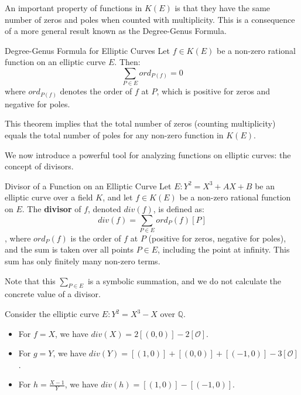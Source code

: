 \documentclass{article}
\begin{document}
An important property of functions in $K(E)$ is that they have the same number of zeros and poles when counted with multiplicity. This is a consequence of a more general result known as the Degree-Genus Formula.

\begin{theorem}{Degree-Genus Formula for Elliptic Curves}{}
Let $f \in K(E)$ be a non-zero rational function on an elliptic curve $E$. Then:
\begin{equation}
    \sum_{P \in E} ord_{P(f)} = 0
\end{equation}
where $ord_{P(f)}$ denotes the order of $f$ at $P$, which is positive for zeros and negative for poles.
\end{theorem}

This theorem implies that the total number of zeros (counting multiplicity) equals the total number of poles for any non-zero function in $K(E)$.

We now introduce a powerful tool for analyzing functions on elliptic curves: the concept of divisors.

\begin{definition}{Divisor of a Function on an Elliptic Curve}{}
Let $E: Y^2 = X^3 + AX + B$ be an elliptic curve over a field $K$, and let $f \in K(E)$ be a non-zero rational function on $E$. The \textbf{divisor} of $f$, denoted $div(f)$, is defined as:
    \begin{equation}
        div(f) = \sum_{P \in E} ord_P(f) [P]
    \end{equation}
, where $ord_P(f)$ is the order of $f$ at $P$ (positive for zeros, negative for poles), and the sum is taken over all points $P \in E$, including the point at infinity. This sum has only finitely many non-zero terms.
\end{definition}

Note that this $\sum_{P \in E}$ is a symbolic summation, and we do not calculate the concrete value of a divisor.

Consider the elliptic curve $E: Y^2 = X^3 - X$ over $\mathbb{Q}$.
\begin{itemize}
    \item For $f = X$, we have $div(X) = 2[(0,0)] - 2[\mathcal{O}]$.
    \item For $g = Y$, we have $div(Y) = [(1,0)] + [(0,0)] + [(-1,0)] - 3[\mathcal{O}]$.
    \item For $h = \frac{X-1}{Y}$, we have $div(h) = [(1,0)] - [(-1,0)]$.
\end{itemize}
\end{document}
